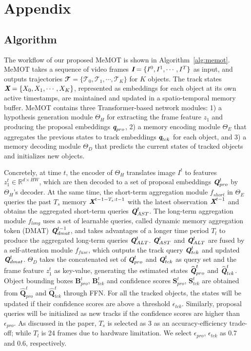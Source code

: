 \vspace{-0.5mm}
\section{Appendix}

\subsection{Algorithm}
\vspace{-2.5mm}

The workflow of our proposed MeMOT is shown in Algorithm~\ref{alg:memot}. 
MeMOT takes a sequence of video frames $\textbf{\em I} = \{I^0, I^1, \cdots, I^T\}$ as input, and outputs trajectories $\mathbfcal{T} = \{\mathcal{T}_0, \mathcal{T}_1, \cdots, \mathcal{T}_K\}$ for $K$ objects. The track states $\textbf{\em X} = \{X_0, X_1, \cdots, X_K\}$, represented as embeddings for each object at its own active timestamps, are maintained and updated in a spatio-temporal memory buffer. 
MeMOT contains three Transformer-based network modules: 1) a hypothesis generation module $\Theta_H$ for extracting the frame feature $z_1$ and producing the proposal embeddings $\textbf{\em q}_{pro}$, 2) a memory encoding module $\Theta_E$ that aggregates the previous states to track embeddings $\textbf{\em q}_{tck}$ for each object, and 3) a memory decoding module $\Theta_D$ that predicts the current states of tracked objects and initializes new objects. 

Concretely, at time $t$, the encoder of $\Theta_H$ translates image $I^t$ to features $z_1^t \in \mathbb{R}^{d \times HW}$, which are then decoded to a set of proposal embeddings $\textbf{\em Q}_{pro}^t$ by $\Theta_H$'s decoder.
At the same time, the short-term aggregation module $f_{short}$ in $\Theta_E$ queries the past $T_s$ memory $\textbf{\em X}^{t-1-T_s:t-1}$ with the latest observation $\textbf{\em X}^{t-1}$ and obtains the aggregated short-term queries $\textbf{\em Q}^t_{AST}$.
The long-term aggregation module $f_{long}$ uses a set of learnable queries, called dynamic memory aggregation token (DMAT) $\textbf{\em Q}_{dmat}^{t-1}$, and takes advantages of a longer time period $T_l$ to produce the aggregated long-term queries $\textbf{\em Q}^t_{ALT}$. $\textbf{\em Q}^t_{AST}$ and $\textbf{\em Q}^t_{ALT}$ are fused by a self-attention module $f_{fuse}$, which outputs the track query $\textbf{\em Q}_{tck}^t$ and updated $\textbf{\em Q}_{dmat}^{t}$. 
$\Theta_D$ takes the concatenated set of $\textbf{\em Q}_{pro}^t$ and $\textbf{\em Q}_{tck}^t$ as query set and the frame feature $z_1^t$ as key-value, generating the estimated states $\widehat{\textbf{\em Q}}_{pro}^t$ and $\widehat{\textbf{\em Q}}_{tck}^t$. 
Object bounding boxes $\textbf{B}_{pro}^t$, $\textbf{B}_{tck}^t$ and confidence scores $\textbf{S}_{pro}^t$, $\textbf{S}_{tck}^t$ are obtained from $\widehat{\textbf{Q}}_{pro}^t$ and $\widehat{\textbf{Q}}_{tck}^t$ through FFN. 
For all the tracked objects, the states will be updated if their confidence scores are above a threshold $\epsilon_{tck}$. Similarly, proposal queries will be initialized as new tracks if the confidence scores are higher than $\epsilon_{pro}$. 
As discussed in the paper, $T_s$ is selected as 3 as an accuracy-efficiency trade-off; while $T_l$ is 24 frames due to hardware limitation. We select $\epsilon_{pro}$, $\epsilon_{tck}$ as 0.7 and 0.6, respectively.
